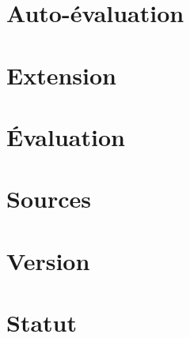 \documentclass[a4paper,11pt]{article}
\begin{document}
\section*{Auto-évaluation}

\section*{Extension}

\section*{Évaluation}

\section*{Sources}

\section*{Version}

\section*{Statut}
\end{document}
